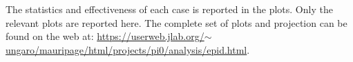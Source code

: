 The statistics and effectiveness of each case is reported in the plots.
Only the relevant plots are reported here. The complete set of plots and projection can
be found on the web at: \href{https://userweb.jlab.org/~ungaro/mauripage/html/projects/pi0/analysis/epid.html}
{https://userweb.jlab.org/$\sim$ungaro/mauripage/html/projects/pi0/analysis/epid.html}.
